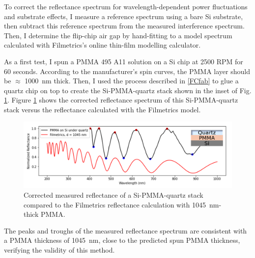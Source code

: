 \documentclass[double,12pt,1in]{beavtex}
\begin{document}
To correct the reflectance spectrum for wavelength-dependent power fluctuations and substrate effects, I measure a reference spectrum using a bare Si substrate, then subtract this reference spectrum from the measured interference spectrum. Then, I determine the flip-chip air gap by hand-fitting to a model spectrum calculated with Filmetrics’s online thin-film modelling calculator. 

As a first test, I spun a PMMA 495 A11 solution on a Si chip at 2500 RPM for 60 seconds. According to the manufacturer's spin curves, the PMMA layer should be $\approx$ \SI{1000}{\nano\meter} thick. Then, I used the process described in \ref{FCfab} to glue a quartz chip on top to create the Si-PMMA-quartz stack shown in the inset of Fig. \ref{PMMAqzspec}. Figure \ref{PMMAqzspec} shows the corrected reflectance spectrum of this Si-PMMA-quartz stack versus the reflectance calculated with the Filmetrics model.


\begin{figure}
    \includegraphics[width=1\textwidth]{qzPMMAsi stack spec.PNG}
    \caption{Corrected measured reflectance of a Si-PMMA-quartz stack compared to the Filmetrics reflectance calculation with \SI{1045}{\nano\meter}-thick PMMA.}
    \label{PMMAqzspec}
\end{figure}

The peaks and troughs of the measured reflectance spectrum are consistent with a PMMA thickness of \SI{1045}{\nano\meter}, close to the predicted spun PMMA thickness, verifying the validity of this method.
\end{document}
